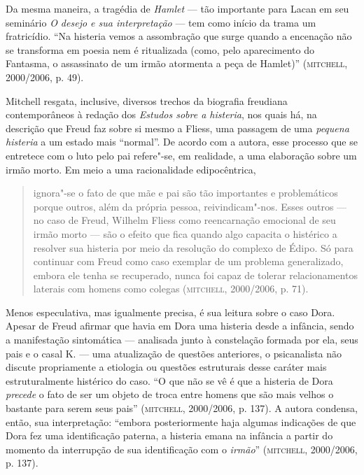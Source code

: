 Da mesma maneira, a tragédia de \emph{Hamlet} --- tão importante para
Lacan em seu seminário \emph{O desejo e sua interpretação} --- tem como
início da trama um fratricídio. ``Na histeria vemos a assombração que
surge quando a encenação não se transforma em poesia nem é ritualizada
(como, pelo aparecimento do Fantasma, o assassinato de um irmão
atormenta a peça de Hamlet)'' (\textsc{mitchell}, 2000/2006, p. 49).

Mitchell resgata, inclusive, diversos trechos da biografia freudiana
contemporâneos à redação dos \emph{Estudos sobre a histeria}, nos quais
há, na descrição que Freud faz sobre si mesmo a Fliess, uma passagem de
uma \emph{pequena histeria} a um estado mais ``normal''. De acordo com a
autora, esse processo que se entretece com o luto pelo pai refere"-se, em
realidade, a uma elaboração sobre um irmão morto. Em meio a uma
racionalidade edipocêntrica,

\begin{quote}
ignora"-se o fato de que mãe e pai são tão importantes e problemáticos
porque outros, além da própria pessoa, reivindicam"-nos. Esses outros ---
no caso de Freud, Wilhelm Fliess como reencarnação emocional de seu
irmão morto --- são o efeito que fica quando algo capacita o histérico a
resolver sua histeria por meio da resolução do complexo de Édipo. Só
para continuar com Freud como caso exemplar de um problema generalizado,
embora ele tenha se recuperado, nunca foi capaz de tolerar
relacionamentos laterais com homens como colegas (\textsc{mitchell}, 2000/2006, p. 71).
\end{quote}

Menos especulativa, mas igualmente precisa, é sua leitura sobre o caso
Dora. Apesar de Freud afirmar que havia em Dora uma histeria desde a
infância, sendo a manifestação sintomática --- analisada junto à
constelação formada por ela, seus pais e o casal K. --- uma atualização
de questões anteriores, o psicanalista não discute propriamente a
etiologia ou questões estruturais desse caráter mais estruturalmente
histérico do caso. ``O que não se vê é que a histeria de Dora
\emph{precede} o fato de ser um objeto de troca entre homens que são
mais velhos o bastante para serem seus pais'' (\textsc{mitchell}, 2000/2006, p.
137). A autora condensa, então, sua interpretação: ``embora
posteriormente haja algumas indicações de que Dora fez uma identificação
paterna, a histeria emana na infância a partir do momento da interrupção
de sua identificação com o \emph{irmão}'' (\textsc{mitchell}, 2000/2006, p. 137).

